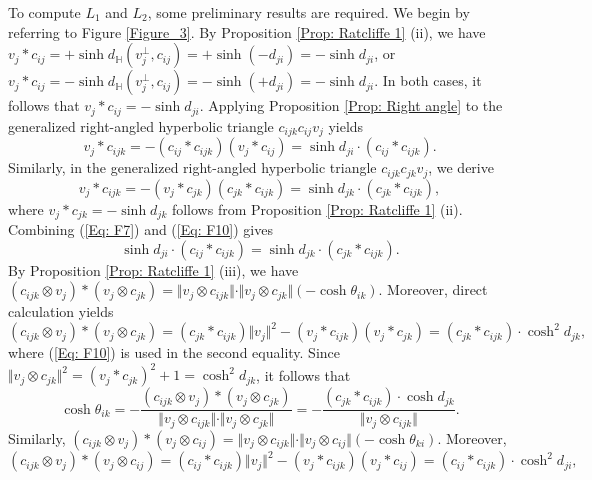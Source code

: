 \documentclass[12pt]{amsart}
\theoremstyle{definition}
\begin{document}
To compute $L_1$ and $L_2$, some preliminary results are required. 
We begin by referring to Figure \ref{Figure_3}.
By Proposition \ref{Prop: Ratcliffe 1} (ii), we have 
$v_j\ast c_{ij}=+\sinh d_\mathbb{H}(v_j^\bot,c_{ij})=+\sinh(-d_{ji})=-\sinh d_{ji}$,
or $v_j\ast c_{ij}=-\sinh d_\mathbb{H}(v_j^\bot,c_{ij})=-\sinh(+d_{ji})=-\sinh d_{ji}$.
In both cases, it follows that $v_j\ast c_{ij}=-\sinh d_{ji}$.
Applying Proposition \ref{Prop: Right angle} to the generalized right-angled hyperbolic triangle $c_{ijk}c_{ij}v_j$ yields
\begin{equation}\label{Eq: F7}
v_j\ast c_{ijk}=-(c_{ij}\ast c_{ijk})(v_j\ast c_{ij})
=\sinh d_{ji}\cdot(c_{ij}\ast c_{ijk}).
\end{equation}
Similarly, in the generalized right-angled hyperbolic  triangle $c_{ijk}c_{jk}v_j$, we derive
\begin{equation}\label{Eq: F10}
v_j\ast c_{ijk}=-(v_j\ast c_{jk})(c_{jk}\ast c_{ijk})=
\sinh d_{jk}\cdot(c_{jk}\ast c_{ijk}),
\end{equation}
where $v_j\ast c_{jk}=-\sinh d_{jk}$ follows from Proposition \ref{Prop: Ratcliffe 1} (ii).
Combining (\ref{Eq: F7}) and (\ref{Eq: F10}) gives
\begin{equation}\label{Eq: F14}
\sinh d_{ji}\cdot(c_{ij}\ast c_{ijk})
=\sinh d_{jk}\cdot(c_{jk}\ast c_{ijk}).
\end{equation}
By Proposition \ref{Prop: Ratcliffe 1} (iii), we have
$(c_{ijk}\otimes v_j)\ast(v_j\otimes c_{jk})
=\Vert v_j\otimes c_{ijk}\Vert \cdot\Vert v_j\otimes c_{jk}\Vert (-\cosh \theta_{ik}).$
Moreover, direct calculation yields
\begin{equation*}
(c_{ijk}\otimes v_j)\ast(v_j\otimes c_{jk})
=(c_{jk}\ast c_{ijk})\Vert v_j\Vert ^2-(v_j\ast c_{ijk})(v_j\ast c_{jk})
=(c_{jk}\ast c_{ijk})\cdot \cosh^2 d_{jk},
\end{equation*}
where (\ref{Eq: F10}) is used in the second equality.
Since $\Vert v_j\otimes c_{jk}\Vert ^2=(v_j\ast c_{jk})^2+1=\cosh^2 d_{jk}$,
it follows that
\begin{equation}\label{Eq: F11}
\cosh \theta_{ik}=-\frac{(c_{ijk}\otimes v_j)\ast(v_j\otimes c_{jk})}{\Vert v_j\otimes c_{ijk}\Vert \cdot\Vert v_j\otimes c_{jk}\Vert }
=-\frac{(c_{jk}\ast c_{ijk})\cdot \cosh d_{jk}}{\Vert v_j\otimes c_{ijk}\Vert }.
\end{equation}
Similarly,
$(c_{ijk}\otimes v_j)\ast(v_j\otimes c_{ij})
=\Vert v_j\otimes c_{ijk}\Vert \cdot\Vert v_j\otimes c_{ij}\Vert (-\cosh \theta_{ki}).$
Moreover,
\begin{equation*}
(c_{ijk}\otimes v_j)\ast(v_j\otimes c_{ij})
=(c_{ij}\ast c_{ijk})\Vert v_j\Vert ^2-(v_j\ast c_{ijk})(v_j\ast c_{ij})
=(c_{ij}\ast c_{ijk})\cdot \cosh^2 d_{ji},
\end{equation*}
\end{document}
